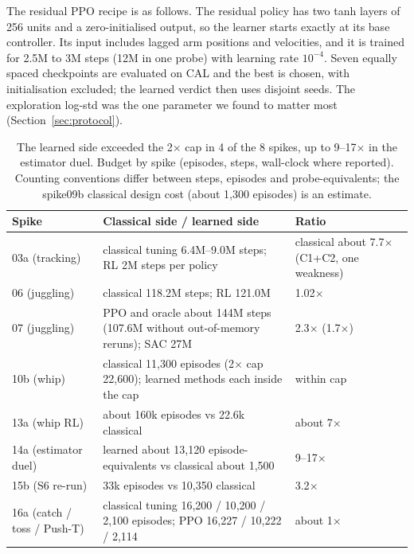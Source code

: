 The residual PPO recipe is as follows. The residual policy has two tanh layers of 256 units and a zero-initialised output, so the learner starts exactly at its base controller. Its input includes lagged arm positions and velocities, and it is trained for 2.5M to 3M steps (12M in one probe) with learning rate $10^{-4}$. Seven equally spaced checkpoints are evaluated on CAL and the best is chosen, with initialisation excluded; the learned verdict then uses disjoint seeds. The exploration log-std was the one parameter we found to matter most (Section~\ref{sec:protocol}).

\begin{table}[htbp]
\centering
\caption{The learned side exceeded the 2$\times$ cap in 4 of the 8 spikes, up to 9--17$\times$ in the estimator duel. Budget by spike (episodes, steps, wall-clock where reported). Counting conventions differ between steps, episodes and probe-equivalents; the spike09b classical design cost (about 1{,}300 episodes) is an estimate.}
\label{tab:budget}
\begin{tabular}{@{}p{2.2cm}p{7.3cm}p{3.7cm}@{}}
\toprule
Spike & Classical side / learned side & Ratio \\ \midrule
03a (tracking) & classical tuning 6.4M--9.0M steps; RL 2M steps per policy & classical about 7.7$\times$ (C1+C2, one weakness) \\
06 (juggling) & classical 118.2M steps; RL 121.0M & 1.02$\times$ \\
07 (juggling) & PPO and oracle about 144M steps (107.6M without out-of-memory reruns); SAC 27M & 2.3$\times$ (1.7$\times$) \\
10b (whip) & classical 11{,}300 episodes (2$\times$ cap 22{,}600); learned methods each inside the cap & within cap \\
13a (whip RL) & about 160k episodes vs 22.6k classical & about 7$\times$ \\
14a (estimator duel) & learned about 13{,}120 episode-equivalents vs classical about 1{,}500 & 9--17$\times$ \\
15b (S6 re-run) & 33k episodes vs 10{,}350 classical & 3.2$\times$ \\
16a (catch / toss / Push-T) & classical tuning 16{,}200 / 10{,}200 / 2{,}100 episodes; PPO 16{,}227 / 10{,}222 / 2{,}114 & about 1$\times$ \\
\bottomrule
\end{tabular}
\end{table}

